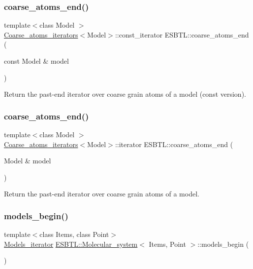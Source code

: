 \subsubsection{\texorpdfstring{coarse\+\_\+atoms\+\_\+end()}{coarse\_atoms\_end()}\hspace{0.1cm}{\footnotesize\ttfamily [3/4]}}
{\footnotesize\ttfamily template$<$class Model $>$ \\
\hyperlink{structESBTL_1_1Coarse__atoms__iterators}{Coarse\+\_\+atoms\+\_\+iterators}$<$Model$>$\+::const\+\_\+iterator E\+S\+B\+T\+L\+::coarse\+\_\+atoms\+\_\+end (\begin{DoxyParamCaption}\item[{const Model \&}]{model }\end{DoxyParamCaption})}

Return the past-\/end iterator over coarse grain atoms of a model (const version). \mbox{\label{group__grp__iters_ga1336e327e3310a72197278ab5b5017b0}} 
\subsubsection{\texorpdfstring{coarse\+\_\+atoms\+\_\+end()}{coarse\_atoms\_end()}\hspace{0.1cm}{\footnotesize\ttfamily [4/4]}}
{\footnotesize\ttfamily template$<$class Model $>$ \\
\hyperlink{structESBTL_1_1Coarse__atoms__iterators}{Coarse\+\_\+atoms\+\_\+iterators}$<$Model$>$\+::iterator E\+S\+B\+T\+L\+::coarse\+\_\+atoms\+\_\+end (\begin{DoxyParamCaption}\item[{Model \&}]{model }\end{DoxyParamCaption})}

Return the past-\/end iterator over coarse grain atoms of a model. \mbox{\label{group__grp__iters_gaed42cb1b0c025e5a74b231384dfe1632}} 
\subsubsection{\texorpdfstring{models\+\_\+begin()}{models\_begin()}\hspace{0.1cm}{\footnotesize\ttfamily [1/2]}}
{\footnotesize\ttfamily template$<$class Items, class Point$>$ \\
\hyperlink{group__grp__iters_ga752760df14baf1b92dac469d712202bc}{Models\+\_\+iterator} \hyperlink{classESBTL_1_1Molecular__system}{E\+S\+B\+T\+L\+::\+Molecular\+\_\+system}$<$ Items, Point $>$\+::models\+\_\+begin (\begin{DoxyParamCaption}{ }\end{DoxyParamCaption})\hspace{0.3cm}{\ttfamily [inline]}}

